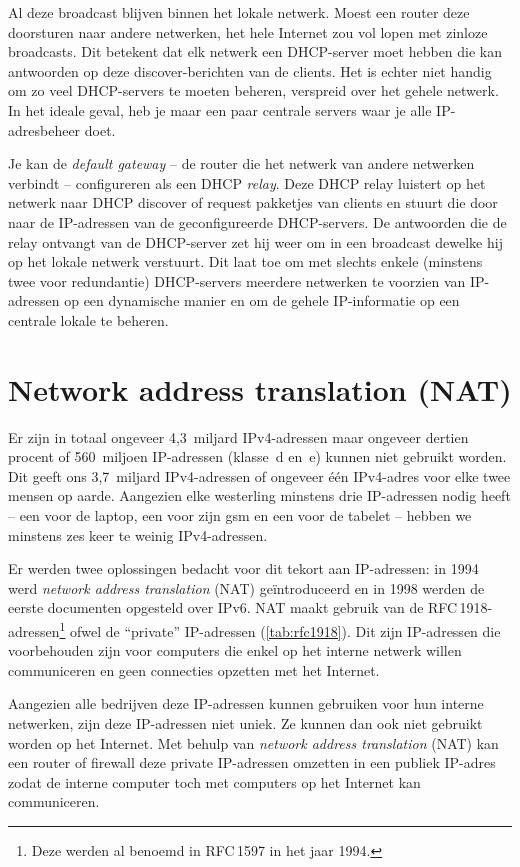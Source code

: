 Al deze broadcast blijven binnen het lokale netwerk.
Moest een router deze doorsturen naar andere netwerken, het hele Internet zou vol lopen met zinloze broadcasts.
Dit betekent dat elk netwerk een DHCP-server moet hebben die kan antwoorden op deze discover-berichten van de clients.
Het is echter niet handig om zo veel DHCP-servers te moeten beheren, verspreid over het gehele netwerk.
In het ideale geval, heb je maar een paar centrale servers waar je alle IP-adresbeheer doet.

Je kan de \emph{default gateway} -- de router die het netwerk van andere netwerken verbindt -- configureren als een DHCP \emph{relay}.
Deze DHCP relay luistert op het netwerk naar DHCP discover of request pakketjes van clients en stuurt die door naar de IP-adressen van de geconfigureerde DHCP-servers.
De antwoorden die de relay ontvangt van de DHCP-server zet hij weer om in een broadcast dewelke hij op het lokale netwerk verstuurt.
Dit laat toe om met slechts enkele (minstens twee voor redundantie) DHCP-servers meerdere netwerken te voorzien van IP-adressen op een dynamische manier en om de gehele IP-informatie op een centrale lokale te beheren.




\section{Network address translation (NAT)}
Er zijn in totaal ongeveer 4,3~miljard IPv4-adressen maar ongeveer dertien procent of 560~miljoen IP-adressen (klasse~d en~e) kunnen niet gebruikt worden.
Dit geeft ons 3,7~miljard IPv4-adressen of ongeveer één IPv4-adres voor elke twee mensen op aarde.
Aangezien elke westerling minstens drie IP-adressen nodig heeft -- een voor de laptop, een voor zijn gsm en een voor de tabelet -- hebben we minstens zes keer te weinig IPv4-adressen.

Er werden twee oplossingen bedacht voor dit tekort aan IP-adressen:
in 1994 werd \emph{network address translation} (NAT) geïntroduceerd en in 1998 werden de eerste documenten opgesteld over IPv6.
NAT maakt gebruik van de RFC\,1918-adressen\footnote{Deze werden al benoemd in RFC\,1597 in het jaar 1994.} ofwel de ``private'' IP-adressen (\vref{tab:rfc1918}).
Dit zijn IP-adressen die voorbehouden zijn voor computers die enkel op het interne netwerk willen communiceren en geen connecties opzetten met het Internet.

Aangezien alle bedrijven deze IP-adressen kunnen gebruiken voor hun interne netwerken, zijn deze IP-adressen niet uniek.
Ze kunnen dan ook niet gebruikt worden op het Internet.
Met behulp van \emph{network address translation} (NAT) kan een router of firewall deze private IP-adressen omzetten in een publiek IP-adres zodat de interne computer toch met computers op het Internet kan communiceren.


